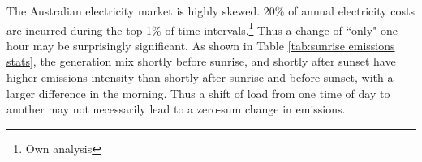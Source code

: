 The Australian electricity market is highly skewed.
20\% of annual electricity costs are incurred during the top 1\% of time intervals.\footnote{Own analysis}
Thus a change of ``only" one hour may be surprisingly significant. As shown in Table \ref{tab:sunrise emissions stats}, the generation mix shortly before sunrise, and shortly after sunset have higher emissions intensity than shortly after sunrise and before sunset, with a larger difference in the morning. Thus a shift of load from one time of day to another may not necessarily lead to a zero-sum change in emissions.

